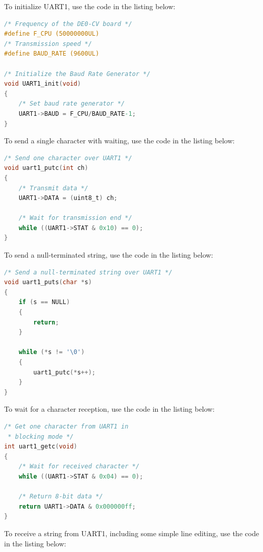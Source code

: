 \documentclass[12pt]{article}
\begin{document}
To initialize UART1, use the code in the listing below:

\begin{lstlisting}[language=C]
/* Frequency of the DE0-CV board */
#define F_CPU (50000000UL)
/* Transmission speed */
#define BAUD_RATE (9600UL)

/* Initialize the Baud Rate Generator */
void UART1_init(void)
{
    /* Set baud rate generator */
    UART1->BAUD = F_CPU/BAUD_RATE-1;
}
\end{lstlisting}

To send a single character with waiting, use the code in the listing below:

\begin{lstlisting}[language=C]
/* Send one character over UART1 */
void uart1_putc(int ch)
{
    /* Transmit data */
    UART1->DATA = (uint8_t) ch;
            
    /* Wait for transmission end */
    while ((UART1->STAT & 0x10) == 0);
}
\end{lstlisting}

To send a null-terminated string, use the code in the listing below:

\begin{lstlisting}[language=C]
/* Send a null-terminated string over UART1 */
void uart1_puts(char *s)
{
    if (s == NULL)
    {
        return;
    }

    while (*s != '\0')
    {
        uart1_putc(*s++);
    }
}
\end{lstlisting}

To wait for a character reception, use the code in the listing below:

\begin{lstlisting}[language=C]
/* Get one character from UART1 in
 * blocking mode */
int uart1_getc(void)
{
    /* Wait for received character */
    while ((UART1->STAT & 0x04) == 0);

    /* Return 8-bit data */
    return UART1->DATA & 0x000000ff;
}
\end{lstlisting}

To receive a string from UART1, including some simple line editing, use the code in the listing below:
\end{document}

